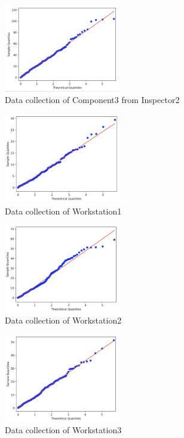 \documentclass{article}
\begin{document}
\begin{figure}[htbp]
\begin{center}
\includegraphics[width=2in]{hist3.png}
\caption{Data collection of Component3 from Inspector2}
\label{data3}
\end{center}
\end{figure}

\begin{figure}[htbp]
\begin{center}
\includegraphics[width=2in]{hist4.png}
\caption{Data collection of Workstation1}
\label{data4}
\end{center}
\end{figure}

\begin{figure}[htbp]
\begin{center}
\includegraphics[width=2in]{hist5.png}
\caption{Data collection of Workstation2}
\label{data5}
\end{center}
\end{figure}

\begin{figure}[htbp]
\begin{center}
\includegraphics[width=2in]{hist6.png}
\caption{Data collection of Workstation3}
\label{data6}
\end{center}
\end{figure}
\end{document}
